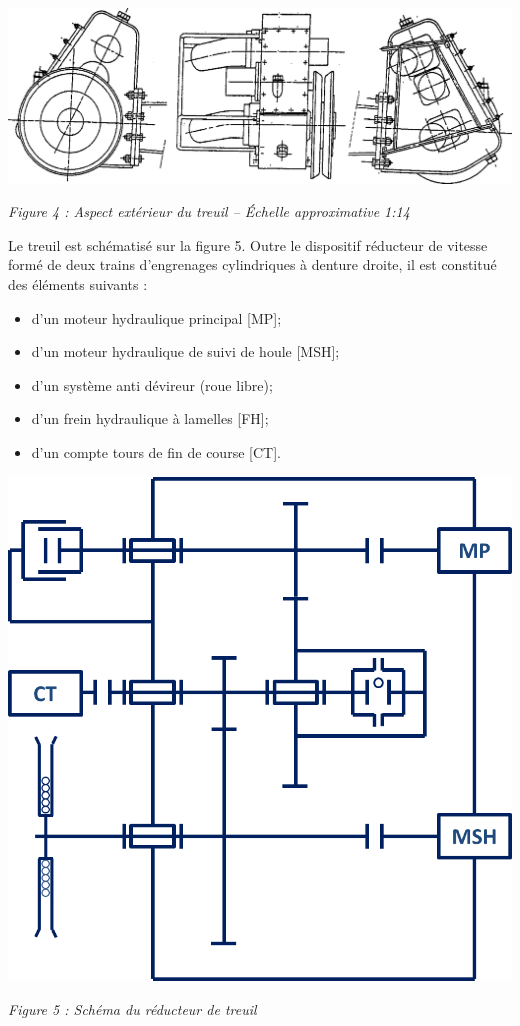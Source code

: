 \documentclass[10pt]{article}
\begin{document}
\begin{center}
\includegraphics[width=.95\textwidth]{images/Treuil}

\textit{Figure 4 : Aspect extérieur du treuil -- Échelle approximative 1:14}
\end{center}

\begin{minipage}[c]{.49\linewidth}
Le treuil est schématisé sur la figure 5. Outre le dispositif réducteur de vitesse formé de deux trains d'engrenages cylindriques à denture droite, il est constitué des éléments suivants : 
\begin{itemize}
\item d'un moteur hydraulique principal [MP];
\item d'un moteur hydraulique de suivi de houle [MSH];
\item d'un système anti dévireur (roue libre);
\item d'un frein hydraulique à lamelles [FH];
\item d'un compte tours de fin de course [CT].
\end{itemize}

\end{minipage} \hfill
\begin{minipage}[c]{.49\linewidth}
\begin{center}
\includegraphics[width=.95\textwidth]{images/schema}

\textit{Figure 5 : Schéma du réducteur de treuil}
\end{center}
\end{minipage} 
\end{document}
